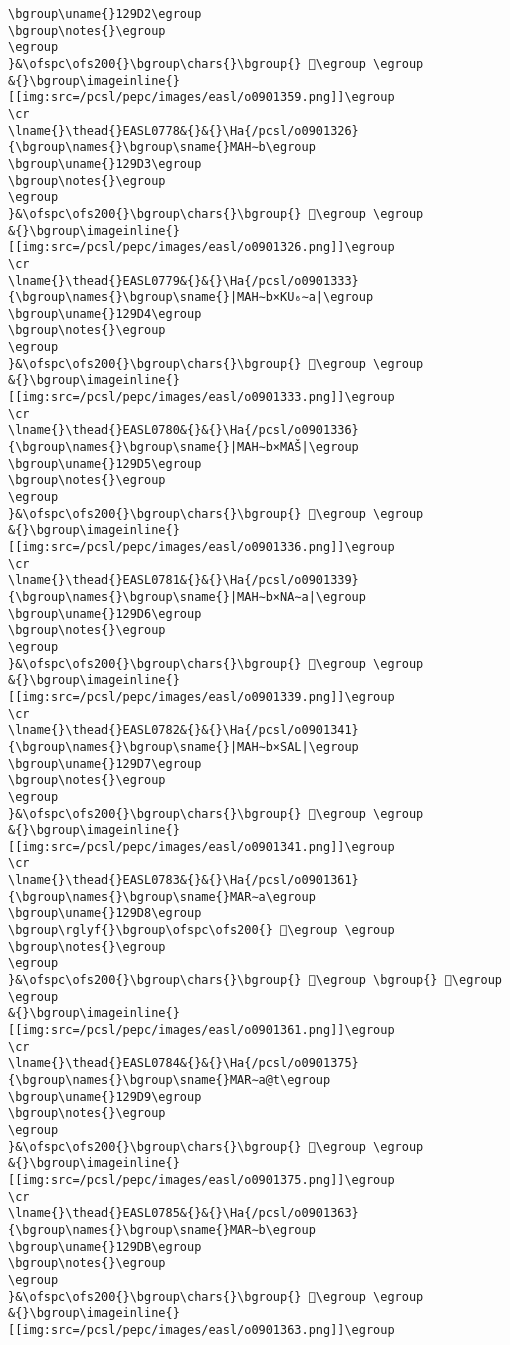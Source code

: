 \begin{verbatim}
\bgroup\uname{}129D2\egroup
\bgroup\notes{}\egroup
\egroup
}&\ofspc\ofs200{}\bgroup\chars{}\bgroup{} 𒧒\egroup \egroup
&{}\bgroup\imageinline{}[[img:src=/pcsl/pepc/images/easl/o0901359.png]]\egroup
\cr
\lname{}\thead{}EASL0778&{}&{}\Ha{/pcsl/o0901326}{\bgroup\names{}\bgroup\sname{}MAH∼b\egroup
\bgroup\uname{}129D3\egroup
\bgroup\notes{}\egroup
\egroup
}&\ofspc\ofs200{}\bgroup\chars{}\bgroup{} 𒧓\egroup \egroup
&{}\bgroup\imageinline{}[[img:src=/pcsl/pepc/images/easl/o0901326.png]]\egroup
\cr
\lname{}\thead{}EASL0779&{}&{}\Ha{/pcsl/o0901333}{\bgroup\names{}\bgroup\sname{}|MAH∼b×KU₆∼a|\egroup
\bgroup\uname{}129D4\egroup
\bgroup\notes{}\egroup
\egroup
}&\ofspc\ofs200{}\bgroup\chars{}\bgroup{} 𒧔\egroup \egroup
&{}\bgroup\imageinline{}[[img:src=/pcsl/pepc/images/easl/o0901333.png]]\egroup
\cr
\lname{}\thead{}EASL0780&{}&{}\Ha{/pcsl/o0901336}{\bgroup\names{}\bgroup\sname{}|MAH∼b×MAŠ|\egroup
\bgroup\uname{}129D5\egroup
\bgroup\notes{}\egroup
\egroup
}&\ofspc\ofs200{}\bgroup\chars{}\bgroup{} 𒧕\egroup \egroup
&{}\bgroup\imageinline{}[[img:src=/pcsl/pepc/images/easl/o0901336.png]]\egroup
\cr
\lname{}\thead{}EASL0781&{}&{}\Ha{/pcsl/o0901339}{\bgroup\names{}\bgroup\sname{}|MAH∼b×NA∼a|\egroup
\bgroup\uname{}129D6\egroup
\bgroup\notes{}\egroup
\egroup
}&\ofspc\ofs200{}\bgroup\chars{}\bgroup{} 𒧖\egroup \egroup
&{}\bgroup\imageinline{}[[img:src=/pcsl/pepc/images/easl/o0901339.png]]\egroup
\cr
\lname{}\thead{}EASL0782&{}&{}\Ha{/pcsl/o0901341}{\bgroup\names{}\bgroup\sname{}|MAH∼b×SAL|\egroup
\bgroup\uname{}129D7\egroup
\bgroup\notes{}\egroup
\egroup
}&\ofspc\ofs200{}\bgroup\chars{}\bgroup{} 𒧗\egroup \egroup
&{}\bgroup\imageinline{}[[img:src=/pcsl/pepc/images/easl/o0901341.png]]\egroup
\cr
\lname{}\thead{}EASL0783&{}&{}\Ha{/pcsl/o0901361}{\bgroup\names{}\bgroup\sname{}MAR∼a\egroup
\bgroup\uname{}129D8\egroup
\bgroup\rglyf{}\bgroup\ofspc\ofs200{} 𒧘\egroup \egroup
\bgroup\notes{}\egroup
\egroup
}&\ofspc\ofs200{}\bgroup\chars{}\bgroup{} 𒧘\egroup \bgroup{} 𒧚\egroup \egroup
&{}\bgroup\imageinline{}[[img:src=/pcsl/pepc/images/easl/o0901361.png]]\egroup
\cr
\lname{}\thead{}EASL0784&{}&{}\Ha{/pcsl/o0901375}{\bgroup\names{}\bgroup\sname{}MAR∼a@t\egroup
\bgroup\uname{}129D9\egroup
\bgroup\notes{}\egroup
\egroup
}&\ofspc\ofs200{}\bgroup\chars{}\bgroup{} 𒧙\egroup \egroup
&{}\bgroup\imageinline{}[[img:src=/pcsl/pepc/images/easl/o0901375.png]]\egroup
\cr
\lname{}\thead{}EASL0785&{}&{}\Ha{/pcsl/o0901363}{\bgroup\names{}\bgroup\sname{}MAR∼b\egroup
\bgroup\uname{}129DB\egroup
\bgroup\notes{}\egroup
\egroup
}&\ofspc\ofs200{}\bgroup\chars{}\bgroup{} 𒧛\egroup \egroup
&{}\bgroup\imageinline{}[[img:src=/pcsl/pepc/images/easl/o0901363.png]]\egroup

\end{verbatim}
